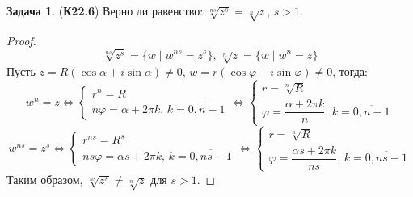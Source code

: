 \documentclass[12pt]{article}
\theoremstyle{definition}
\newtheorem{problem}{Задача}
\newcommand{\ovl}[1]{\overline{#1}}
\begin{document}
\begin{problem}(\textbf{К22.6})
	Верно ли равенство: $\sqrt[ns]{z^s} = \sqrt[n]{z}, \, s >1$.
\end{problem}
\begin{proof}
	$$
		\sqrt[ns]{z^s} = \{w \mid w^{ns} = z^s\}, \, \sqrt[n]{z} = \{w \mid w^n = z\}
	$$
	Пусть $z = R(\cos\alpha + i\sin\alpha) \neq 0$, $w = r(\cos\varphi + i\sin\varphi) \neq 0$, тогда:
	$$
		w^n = z \Leftrightarrow 
		\begin{cases}
			r^n = R\\
			n\varphi = \alpha + 2\pi k, \, k = \ovl{0,n-1} 
		\end{cases} \Leftrightarrow
		\begin{cases}
			r = \sqrt[n]{R}\\
			\varphi = \dfrac{\alpha + 2\pi k}{n}, \, k = \ovl{0,n-1} 
		\end{cases}
	$$
	$$
		w^{ns} = z^s \Leftrightarrow 
		\begin{cases}
			r^{ns} = R^s\\
			ns\varphi = \alpha s + 2\pi k, \, k = \ovl{0,ns-1}  
		\end{cases} \Leftrightarrow
		\begin{cases}
			r = \sqrt[n]{R}\\
			\varphi = \dfrac{\alpha s + 2\pi k}{ns}, \, k = \ovl{0,ns-1}  
		\end{cases}
	$$
	Таким образом, $\sqrt[ns]{z^s} \neq \sqrt[n]{z}$ для $s > 1$.
\end{proof}
\end{document}

